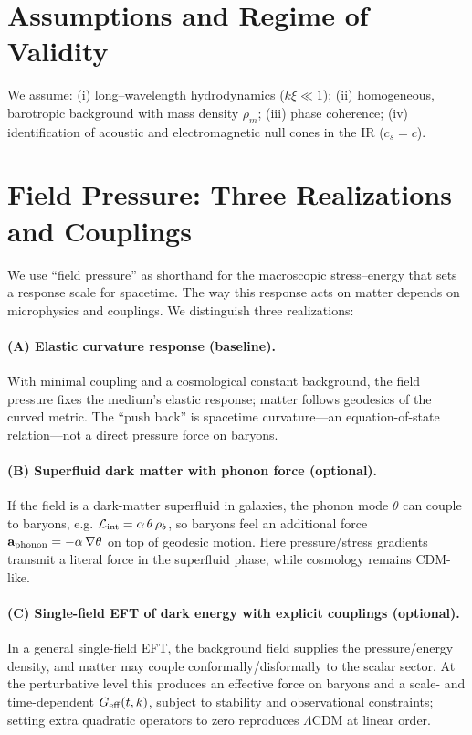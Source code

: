 \documentclass[11pt,a4paper]{article}
\begin{document}
\section{Assumptions and Regime of Validity}
We assume: (i) long--wavelength hydrodynamics ($k\xi\ll1$); (ii) homogeneous, barotropic background with mass density $\rho_m$; (iii) phase coherence; (iv) identification of acoustic and electromagnetic null cones in the IR ($c_s=c$).

\section{Field Pressure: Three Realizations and Couplings}
\label{sec:three-realizations}

We use ``field pressure'' as shorthand for the macroscopic stress--energy that sets a response scale for spacetime. The way this response acts on matter depends on microphysics and couplings. We distinguish three realizations:

\paragraph{(A) Elastic curvature response (baseline).}
With minimal coupling and a cosmological constant background, the field pressure fixes the medium's elastic response; matter follows geodesics of the curved metric. The ``push back'' is spacetime curvature---an equation-of-state relation---not a direct pressure force on baryons.\cite{Jacobson1995,Padmanabhan2004,Sakharov1967}

\paragraph{(B) Superfluid dark matter with phonon force (optional).}
If the field is a dark-matter superfluid in galaxies, the phonon mode $\theta$ can couple to baryons, e.g.
$\mathcal{L}_{\rm int}=\alpha\,\theta\,\rho_b$, so baryons feel an additional force
$\mathbf{a}_{\rm phonon}=-\alpha\,\nabla\theta$ on top of geodesic motion. Here pressure/stress gradients transmit a literal force in the superfluid phase, while cosmology remains CDM-like.\cite{BerezhianiKhoury2015,KhouryPLB2015}

\paragraph{(C) Single-field EFT of dark energy with explicit couplings (optional).}
In a general single-field EFT, the background field supplies the pressure/energy density, and matter may couple conformally/disformally to the scalar sector. At the perturbative level this produces an effective force on baryons and a scale- and time-dependent $G_{\rm eff}(t,k)$, subject to stability and observational constraints; setting extra quadratic operators to zero reproduces $\Lambda$CDM at linear order.\cite{Gubitosi2013}
\end{document}
